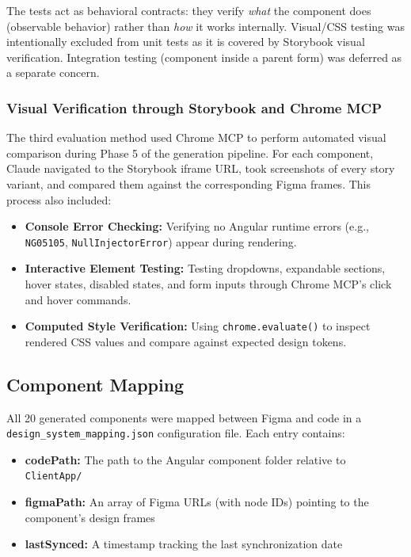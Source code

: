 The tests act as behavioral contracts: they verify \textit{what} the component does (observable behavior) rather than \textit{how} it works internally. Visual/CSS testing was intentionally excluded from unit tests as it is covered by Storybook visual verification. Integration testing (component inside a parent form) was deferred as a separate concern.

\subsubsection{Visual Verification through Storybook and Chrome MCP}

The third evaluation method used Chrome MCP to perform automated visual comparison during Phase 5 of the generation pipeline. For each component, Claude navigated to the Storybook iframe URL, took screenshots of every story variant, and compared them against the corresponding Figma frames. This process also included:

\begin{itemize}
    \item \textbf{Console Error Checking:} Verifying no Angular runtime errors (e.g., \texttt{NG05105}, \texttt{NullInjectorError}) appear during rendering.
    \item \textbf{Interactive Element Testing:} Testing dropdowns, expandable sections, hover states, disabled states, and form inputs through Chrome MCP's click and hover commands.
    \item \textbf{Computed Style Verification:} Using \texttt{chrome.evaluate()} to inspect rendered CSS values and compare against expected design tokens.
\end{itemize}

\subsection{Component Mapping}

All 20 generated components were mapped between Figma and code in a \\ \texttt{design\_system\_mapping.json} configuration file. Each entry contains:

\begin{itemize}
    \item \textbf{codePath:} The path to the Angular component folder relative to \texttt{ClientApp/}
    \item \textbf{figmaPath:} An array of Figma URLs (with node IDs) pointing to the component's design frames
    \item \textbf{lastSynced:} A timestamp tracking the last synchronization date
\end{itemize}

